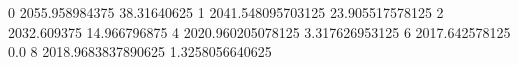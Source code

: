 0 2055.958984375 38.31640625
1 2041.548095703125 23.905517578125
2 2032.609375 14.966796875
4 2020.960205078125 3.317626953125
6 2017.642578125 0.0
8 2018.9683837890625 1.3258056640625
